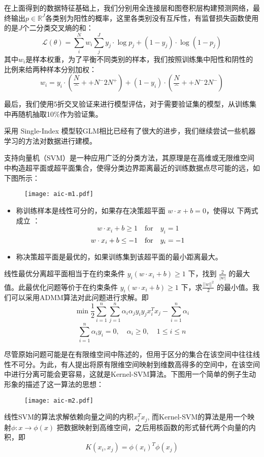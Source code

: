 \documentclass[a4paper,UTF8]{article}
\begin{document}
在上面得到的数据特征基础上，我们分别用全连接层和图卷积层构建预测网络，最终输出$p \in \mathbb R^J$各类别为阳性的概率，这里各类别没有互斥性，有监督损失函数使用的是$J$个二分类交叉熵的和：
$$\mathcal L(\theta) = \sum_i^N w_i \sum_j^{J} y_j\cdot \log p_j + (1-y_j)\cdot \log (1-p_j) $$
其中$w_i$是样本权重，为了平衡不同类别的样本，我们按照训练集中阳性和阴性的比例来给两种样本分别加权：
$$w_i=y_i \cdot (\frac N^++N^- 2N^+) + (1-y_i) \cdot (\frac N^++N^- 2N^-)$$

最后，我们使用5折交叉验证来进行模型评估，对于需要验证集的模型，从训练集中再随机抽取10\%作为验证集。



采用 Single-Index 模型较GLM相比已经有了很大的进步，我们继续尝试一些机器学习的方法对数据进行建模。

支持向量机（SVM）是一种应用广泛的分类方法，其原理是在高维或无限维空间中构造超平面或超平面集合，使得分类边界距离最近的训练数据点尽可能的远，如下图所示：
\begin{figure}[H]
	\centering\texttt{[image: aic-m1.pdf]}
\end{figure}
\begin{itemize}
	\item 称训练样本是线性可分的，如果存在决策超平面 $w\cdot x+b=0 $，使得以
	下两式成立 ：
	$$w\cdot x_{i}+b\geq 1 \quad\text{for}\quad y_{i}=1 $$
	$$w\cdot x_{i}+b\leq -1 \quad\text{for\quad} y_{i}=-1 $$
	\item 称决策超平面是最优的，如果训练集到该超平面的最小距离最大。
\end{itemize}

线性最优分离超平面相当于在约束条件 $y_{i}(w\cdot x_{i}+b) \geq 1$ 下，找到 $\frac{2}{|w|}$ 的最大值。此最优化问题等价于在约束条件 $y_{i}(w\cdot x_{i}+b) \geq 1$ 下，求$ \frac{||w ||^{2}}{2}$	的最小值。我们可以采用ADMM算法对此问题进行求解。即
$$\min \frac{1}{2}  \sum_{i=1}^{n}\sum_{j=1}^{n} \alpha_{i}\alpha_{j}y_{i}y_{j}x_{i}^{T}x_{j} - \sum_{i=1}^{n}\alpha_{i}$$
$$\sum_{i=1}^{n}\alpha_{i}y_{i}=0,\quad \alpha_{i} \geq 0,\quad 1\leq i \leq n $$

尽管原始问题可能是在有限维空间中陈述的，但用于区分的集合在该空间中往往线性不可分。为此，有人提出将原有限维空间映射到维数高得多的空间中，在该空间中进行分离可能会更容易，这就是Kernel-SVM算法。下图用一个简单的例子生动形象的描述了这一算法的思想：
\begin{figure}[H]
	\centering\texttt{[image: aic-m2.pdf]}
\end{figure}

线性SVM的算法求解依赖向量之间的内积$x_{i}^{T}x_{j}$, 而Kernel-SVM的算法是用一个映射$\phi:x\rightarrow\phi(x)$ 把数据映射到高维空间，之后用核函数的形式替代两个向量的内积，即
$$K(x_{i},x_{j})=\phi(x_{i})^{T}\phi(x_{j}) $$
\end{document}
